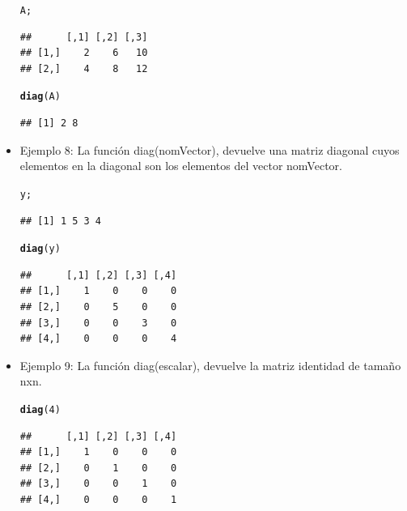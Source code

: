 \documentclass[12pt,letterpaper]{article}\usepackage[]{graphicx}\usepackage[]{color}
\makeatletter
\newcommand{\hlnum}[1]{\textcolor[rgb]{0.686,0.059,0.569}{#1}}%
\newcommand{\hlstd}[1]{\textcolor[rgb]{0.345,0.345,0.345}{#1}}%
\newcommand{\hlkwd}[1]{\textcolor[rgb]{0.737,0.353,0.396}{\textbf{#1}}}%
\newenvironment{kframe}{%
 \def\at@end@of@kframe{}%
 \ifinner\ifhmode%
  \def\at@end@of@kframe{\end{minipage}}%
  \begin{minipage}{\columnwidth}%
 \fi\fi%
 \def\FrameCommand##1{\hskip\@totalleftmargin \hskip-\fboxsep
 \colorbox{shadecolor}{##1}\hskip-\fboxsep
     \hskip-\linewidth \hskip-\@totalleftmargin \hskip\columnwidth}%
 \MakeFramed {\advance\hsize-\width
   \@totalleftmargin\z@ \linewidth\hsize
   \@setminipage}}%
 {\par\unskip\endMakeFramed%
 \at@end@of@kframe}
\newenvironment{knitrout}{}{} %
\makeatother
\begin{document}
\begin{itemize}
\begin{knitrout}
\color{fgcolor}\begin{kframe}
\begin{alltt}
\hlstd{A;}
\end{alltt}
\begin{verbatim}
##      [,1] [,2] [,3]
## [1,]    2    6   10
## [2,]    4    8   12
\end{verbatim}
\begin{alltt}
\hlkwd{diag}\hlstd{(A)}
\end{alltt}
\begin{verbatim}
## [1] 2 8
\end{verbatim}
\end{kframe}
\end{knitrout}
\item Ejemplo 8: La funci\'on diag(nomVector), devuelve una matriz diagonal cuyos elementos en la diagonal son los elementos del vector nomVector.
\begin{knitrout}
\color{fgcolor}\begin{kframe}
\begin{alltt}
\hlstd{y;}
\end{alltt}
\begin{verbatim}
## [1] 1 5 3 4
\end{verbatim}
\begin{alltt}
\hlkwd{diag}\hlstd{(y)}
\end{alltt}
\begin{verbatim}
##      [,1] [,2] [,3] [,4]
## [1,]    1    0    0    0
## [2,]    0    5    0    0
## [3,]    0    0    3    0
## [4,]    0    0    0    4
\end{verbatim}
\end{kframe}
\end{knitrout}
\item Ejemplo 9: La funci\'on diag(escalar), devuelve la matriz identidad de tama\~no nxn.
\begin{knitrout}
\color{fgcolor}\begin{kframe}
\begin{alltt}
\hlkwd{diag}\hlstd{(}\hlnum{4}\hlstd{)}
\end{alltt}
\begin{verbatim}
##      [,1] [,2] [,3] [,4]
## [1,]    1    0    0    0
## [2,]    0    1    0    0
## [3,]    0    0    1    0
## [4,]    0    0    0    1
\end{verbatim}
\end{kframe}
\end{knitrout}
\end{itemize}
\end{document}
